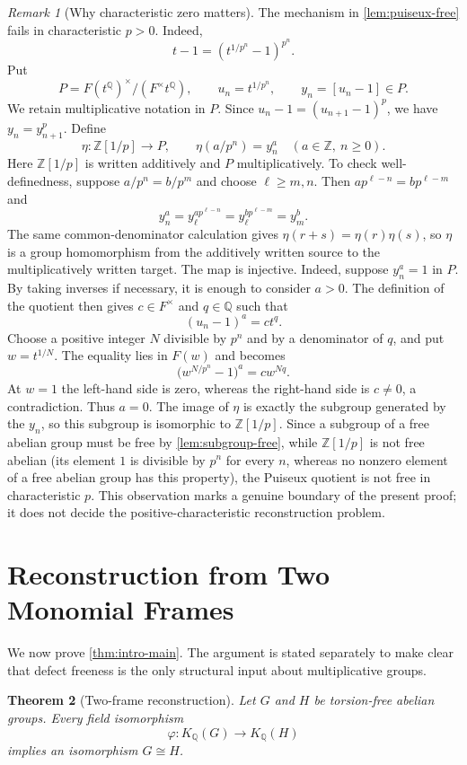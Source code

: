 \documentclass[11pt,a4paper]{article}
\numberwithin{equation}{section}
\theoremstyle{plain}
\newtheorem{theorem}{Theorem}[section]
\theoremstyle{definition}
\theoremstyle{remark}
\newtheorem{remark}[theorem]{Remark}
\newcommand{\Q}{\mathbb Q}
\newcommand{\Z}{\mathbb Z}
\newcommand{\KQ}[1]{K_{\Q}(#1)}
\begin{document}
\begin{remark}[Why characteristic zero matters]\label{rem:char-p}
The mechanism in \cref{lem:puiseux-free} fails in characteristic $p>0$.
Indeed,
\[
  t-1=(t^{1/p^n}-1)^{p^n}.
\]
Put
\[
  P=F(t^{\Q})^\times/(F^\times t^{\Q}),
  \qquad u_n=t^{1/p^n},
  \qquad y_n=[u_n-1]\in P.
\]
We retain multiplicative notation in $P$.  Since
$u_n-1=(u_{n+1}-1)^p$, we have $y_n=y_{n+1}^p$.  Define
\[
  \eta:\Z[1/p]\longrightarrow
  P,
  \qquad \eta(a/p^n)=y_n^a
  \quad(a\in\Z,\ n\geq0).
\]
Here $\Z[1/p]$ is written additively and $P$ multiplicatively.  To check
well-definedness, suppose $a/p^n=b/p^m$ and choose
$\ell\geq m,n$.  Then $ap^{\ell-n}=bp^{\ell-m}$ and
\[
  y_n^a=y_\ell^{ap^{\ell-n}}
  =y_\ell^{bp^{\ell-m}}=y_m^b.
\]
The same common-denominator calculation gives
$\eta(r+s)=\eta(r)\eta(s)$, so $\eta$ is a group homomorphism from the
additively written source to the multiplicatively written target.
The map is injective.  Indeed, suppose $y_n^a=1$ in $P$.  By taking
inverses if necessary, it is enough to consider $a>0$.  The definition of
the quotient then gives $c\in F^\times$ and $q\in\Q$ such that
\[
  (u_n-1)^a=ct^q.
\]
Choose a positive integer $N$ divisible by $p^n$ and by a denominator of
$q$, and put $w=t^{1/N}$.  The equality lies in $F(w)$ and becomes
\[
  \bigl(w^{N/p^n}-1\bigr)^a=cw^{Nq}.
\]
At $w=1$ the left-hand side is zero, whereas the right-hand side is
$c\neq0$, a contradiction.  Thus $a=0$.  The image of $\eta$ is exactly
the subgroup generated by the $y_n$, so this subgroup is isomorphic to
$\Z[1/p]$.  Since a subgroup of a free abelian group must be free by
\cref{lem:subgroup-free}, while $\Z[1/p]$ is not free abelian (its element
$1$ is divisible by $p^n$ for every $n$, whereas no nonzero element of a
free abelian group has this property), the Puiseux
quotient is not free in characteristic
$p$.  This observation marks a genuine boundary of the present proof; it
does not decide the positive-characteristic reconstruction problem.
\end{remark}

\section{Reconstruction from Two Monomial Frames}\label{sec:reconstruction}

We now prove \cref{thm:intro-main}.  The argument is stated separately to
make clear that defect freeness is the only structural input about
multiplicative groups.

\begin{theorem}[Two-frame reconstruction]\label{thm:reconstruction}
Let $G$ and $H$ be torsion-free abelian groups.  Every field isomorphism
\[
  \varphi:\KQ G\longrightarrow\KQ H
\]
implies an isomorphism $G\cong H$.
\end{theorem}
\end{document}

